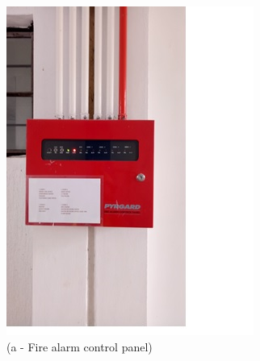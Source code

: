 \begin{figure}
	\begin{minipage}[b]{0.2\linewidth}
		\centering
				\includegraphics[width=\textwidth]{figures/R1P_fdas/fdas_panel}
		\caption*{(a - Fire alarm control panel)}
	\end{minipage}
	\hspace{0.05cm}
	\begin{minipage}[b]{0.2\linewidth}
		\centering

\end{minipage}
\end{figure}

